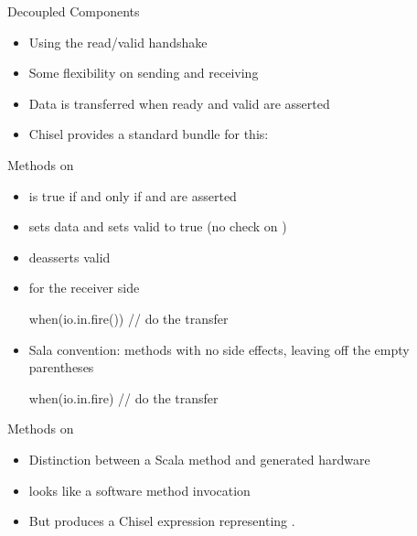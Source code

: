 \begin{frame}[fragile]{Decoupled Components}
\begin{itemize}
\item Using the read/valid handshake
\item Some flexibility on sending and receiving
\item Data is transferred when ready and valid are asserted
\item Chisel provides a standard bundle for this: 
\end{itemize}
\end{frame}

\begin{frame}[fragile]{Methods on }
\begin{itemize}
\item {} is true if and only if  and  are asserted
\item {} sets data and sets valid to true (no check on )
\item {} deasserts valid
\item {} for the receiver side
\begin{chisel}
when(io.in.fire()) {
  // do the transfer
}
\end{chisel}
\item Sala convention: methods with no side effects, leaving off the empty parentheses
\begin{chisel}
when(io.in.fire) {
  // do the transfer
}
\end{chisel}
\end{itemize}
\end{frame}

\begin{frame}[fragile]{Methods on }
\begin{itemize}
\item Distinction between a Scala method and generated hardware
\item {} looks like a software method invocation
\item But produces a Chisel  expression representing .
\end{itemize}
\end{frame}

